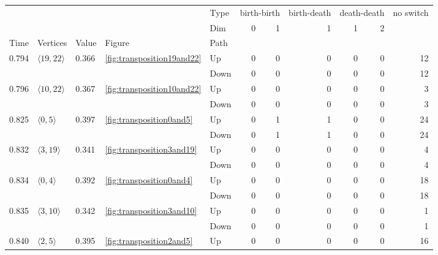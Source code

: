 \documentclass{article}
\begin{document}
\begin{center}
\begin{tabular}{lllllrrrrrr}
\toprule
 &  &  &  & Type & \multicolumn{2}{r}{birth-birth} & birth-death & \multicolumn{2}{r}{death-death} & no switch \\
 &  &  &  & Dim & 0 & 1 & 1 & 1 & 2 &  \\
Time & Vertices & Value & Figure & Path &  &  &  &  &  &  \\
\midrule
\multirow[t]{2}{*}{0.794} & \multirow[t]{2}{*}{$\langle19, 22\rangle$} & \multirow[t]{2}{*}{0.366} & \multirow[t]{2}{*}{\ref{fig:transposition19and22}} & Up & 0 & 0 & 0 & 0 & 0 & 12 \\
 &  &  &  & Down & 0 & 0 & 0 & 0 & 0 & 12 \\
\cline{1-11} \cline{2-11} \cline{3-11} \cline{4-11}
\multirow[t]{2}{*}{0.796} & \multirow[t]{2}{*}{$\langle10, 22\rangle$} & \multirow[t]{2}{*}{0.367} & \multirow[t]{2}{*}{\ref{fig:transposition10and22}} & Up & 0 & 0 & 0 & 0 & 0 & 3 \\
 &  &  &  & Down & 0 & 0 & 0 & 0 & 0 & 3 \\
\cline{1-11} \cline{2-11} \cline{3-11} \cline{4-11}
\multirow[t]{2}{*}{0.825} & \multirow[t]{2}{*}{$\langle0, 5\rangle$} & \multirow[t]{2}{*}{0.397} & \multirow[t]{2}{*}{\ref{fig:transposition0and5}} & Up & 0 & 1 & 1 & 0 & 0 & 24 \\
 &  &  &  & Down & 0 & 1 & 1 & 0 & 0 & 24 \\
\cline{1-11} \cline{2-11} \cline{3-11} \cline{4-11}
\multirow[t]{2}{*}{0.832} & \multirow[t]{2}{*}{$\langle3, 19\rangle$} & \multirow[t]{2}{*}{0.341} & \multirow[t]{2}{*}{\ref{fig:transposition3and19}} & Up & 0 & 0 & 0 & 0 & 0 & 4 \\
 &  &  &  & Down & 0 & 0 & 0 & 0 & 0 & 4 \\
\cline{1-11} \cline{2-11} \cline{3-11} \cline{4-11}
\multirow[t]{2}{*}{0.834} & \multirow[t]{2}{*}{$\langle0, 4\rangle$} & \multirow[t]{2}{*}{0.392} & \multirow[t]{2}{*}{\ref{fig:transposition0and4}} & Up & 0 & 0 & 0 & 0 & 0 & 18 \\
 &  &  &  & Down & 0 & 0 & 0 & 0 & 0 & 18 \\
\cline{1-11} \cline{2-11} \cline{3-11} \cline{4-11}
\multirow[t]{2}{*}{0.835} & \multirow[t]{2}{*}{$\langle3, 10\rangle$} & \multirow[t]{2}{*}{0.342} & \multirow[t]{2}{*}{\ref{fig:transposition3and10}} & Up & 0 & 0 & 0 & 0 & 0 & 1 \\
 &  &  &  & Down & 0 & 0 & 0 & 0 & 0 & 1 \\
\cline{1-11} \cline{2-11} \cline{3-11} \cline{4-11}
\multirow[t]{2}{*}{0.840} & \multirow[t]{2}{*}{$\langle2, 5\rangle$} & \multirow[t]{2}{*}{0.395} & \multirow[t]{2}{*}{\ref{fig:transposition2and5}} & Up & 0 & 0 & 0 & 0 & 0 & 16 \\

\end{tabular}
\end{center}
\end{document}
